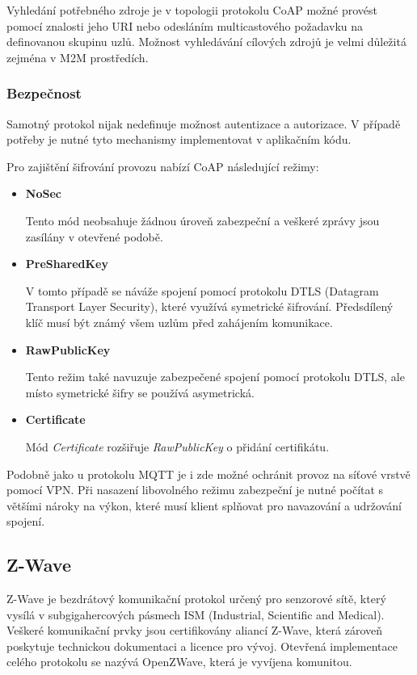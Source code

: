   Vyhledání potřebného zdroje je v topologii protokolu CoAP možné provést pomocí
   znalosti jeho URI nebo odesláním multicastového požadavku na definovanou
   skupinu uzlů. Možnost vyhledávání cílových zdrojů je velmi důležitá zejména
   v M2M prostředích. \cite{coap}
   
   \subsubsection{Bezpečnost}
   Samotný protokol nijak nedefinuje možnost autentizace a autorizace. V případě
   potřeby je nutné tyto mechanismy implementovat v aplikačním kódu. 
   
   Pro zajištění šifrování provozu nabízí CoAP následující režimy:
   \begin{itemize}
    \item \textbf{NoSec}
    
    Tento mód neobsahuje žádnou úroveň zabezpeční a veškeré zprávy jsou zasílány
    v otevřené podobě. 
    
    \item \textbf{PreSharedKey}
    
    V tomto případě se náváže spojení pomocí protokolu DTLS (Datagram Transport
    Layer Security), které využívá symetrické šifrování. Předsdílený klíč musí
    být známý všem uzlům před zahájením komunikace. 
    
    \item \textbf{RawPublicKey}
    
    Tento režim také navuzuje zabezpečené spojení pomocí protokolu DTLS, ale místo
    symetrické šifry se používá asymetrická.
    
    \item \textbf{Certificate}
    
    Mód \textit{Certificate} rozšiřuje \textit{RawPublicKey} o přidání certifikátu.
   \end{itemize}

   Podobně jako u protokolu MQTT je i zde možné ochránit provoz na síťové
   vrstvě pomocí VPN. Při nasazení libovolného režimu zabezpeční je nutné počítat 
   s většími nároky na výkon, které musí klient splňovat pro navazování a udržování 
   spojení. \cite{coap}
   
  \subsection{Z-Wave}
  
  Z-Wave je bezdrátový komunikační protokol určený pro senzorové sítě, který vysílá 
  v subgigahercových pásmech ISM (Industrial, Scientific and Medical). Veškeré komunikační
  prvky jsou certifikovány aliancí Z-Wave, která zároveň poskytuje technickou dokumentaci a
  licence pro vývoj. Otevřená implementace celého protokolu se nazývá OpenZWave, která %
  je vyvíjena komunitou. %
 
